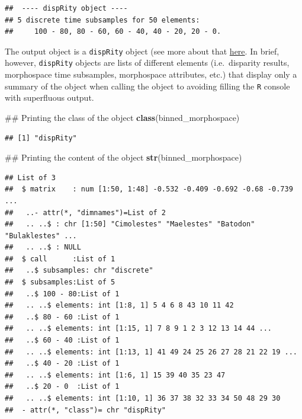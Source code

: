 \documentclass[]{book}
\newenvironment{Shaded}{\begin{snugshade}}{\end{snugshade}}
\newcommand{\KeywordTok}[1]{\textcolor[rgb]{0.13,0.29,0.53}{\textbf{#1}}}
\newcommand{\NormalTok}[1]{#1}
\theoremstyle{definition}
\theoremstyle{definition}
\theoremstyle{remark}
\begin{document}
\begin{verbatim}
##  ---- dispRity object ---- 
## 5 discrete time subsamples for 50 elements:
##     100 - 80, 80 - 60, 60 - 40, 40 - 20, 20 - 0.
\end{verbatim}

The output object is a \texttt{dispRity} object (see more about that
\protect\hyperlink{The-guts-of-the-dispRity-package}{here}. In brief,
however, \texttt{dispRity} objects are lists of different elements
(i.e.~disparity results, morphospace time subsamples, morphospace
attributes, etc.) that display only a summary of the object when calling
the object to avoiding filling the \texttt{R} console with superfluous
output.

\begin{Shaded}
\begin{Highlighting}[]
\NormalTok{## Printing the class of the object}
\KeywordTok{class}\NormalTok{(binned_morphospace)}
\end{Highlighting}
\end{Shaded}

\begin{verbatim}
## [1] "dispRity"
\end{verbatim}

\begin{Shaded}
\begin{Highlighting}[]
\NormalTok{## Printing the content of the object}
\KeywordTok{str}\NormalTok{(binned_morphospace)}
\end{Highlighting}
\end{Shaded}

\begin{verbatim}
## List of 3
##  $ matrix    : num [1:50, 1:48] -0.532 -0.409 -0.692 -0.68 -0.739 ...
##   ..- attr(*, "dimnames")=List of 2
##   .. ..$ : chr [1:50] "Cimolestes" "Maelestes" "Batodon" "Bulaklestes" ...
##   .. ..$ : NULL
##  $ call      :List of 1
##   ..$ subsamples: chr "discrete"
##  $ subsamples:List of 5
##   ..$ 100 - 80:List of 1
##   .. ..$ elements: int [1:8, 1] 5 4 6 8 43 10 11 42
##   ..$ 80 - 60 :List of 1
##   .. ..$ elements: int [1:15, 1] 7 8 9 1 2 3 12 13 14 44 ...
##   ..$ 60 - 40 :List of 1
##   .. ..$ elements: int [1:13, 1] 41 49 24 25 26 27 28 21 22 19 ...
##   ..$ 40 - 20 :List of 1
##   .. ..$ elements: int [1:6, 1] 15 39 40 35 23 47
##   ..$ 20 - 0  :List of 1
##   .. ..$ elements: int [1:10, 1] 36 37 38 32 33 34 50 48 29 30
##  - attr(*, "class")= chr "dispRity"
\end{verbatim}
\end{document}

